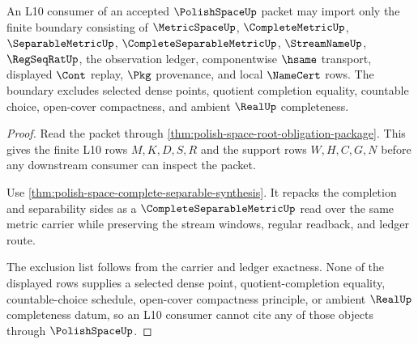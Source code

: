 \begin{theorem}
\label{thm:polish-space-l10-consumer-boundary}
An L10 consumer of an accepted $\PolishSpaceUp$ packet may import only the finite boundary consisting of $\MetricSpaceUp$, $\CompleteMetricUp$, $\SeparableMetricUp$, $\CompleteSeparableMetricUp$, $\StreamNameUp$, $\RegSeqRatUp$, the observation ledger, componentwise $\hsame$ transport, displayed $\Cont$ replay, $\Pkg$ provenance, and local $\NameCert$ rows. The boundary excludes selected dense points, quotient completion equality, countable choice, open-cover compactness, and ambient $\RealUp$ completeness.
\end{theorem}
\begin{proof}
Read the packet through \autoref{thm:polish-space-root-obligation-package}. This gives the finite L10 rows $M,K,D,S,R$ and the support rows $W,H,C,G,N$ before any downstream consumer can inspect the packet.

Use \autoref{thm:polish-space-complete-separable-synthesis}. It repacks the completion and separability sides as a $\CompleteSeparableMetricUp$ read over the same metric carrier while preserving the stream windows, regular readback, and ledger route.

The exclusion list follows from the carrier and ledger exactness. None of the displayed rows supplies a selected dense point, quotient-completion equality, countable-choice schedule, open-cover compactness principle, or ambient $\RealUp$ completeness datum, so an L10 consumer cannot cite any of those objects through $\PolishSpaceUp$.
\end{proof}

